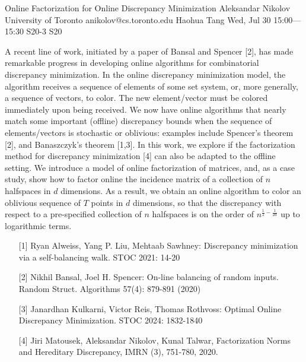 \begin{talk}
  {Online Factorization for Online Discrepancy Minimization}%
  {Aleksandar Nikolov}%
  {University of Toronto}%
  {anikolov@cs.toronto.edu}%
  {Haohua Tang}%
  {}%
  {Wed, Jul 30 15:00---15:30}%
  {S20-3}%
  {S20}%
  
    
   
A recent line of work, initiated by a paper of Bansal and Spencer [2], has made remarkable progress in developing online algorithms for combinatorial discrepancy minimization. In the online discrepancy minimization model, the algorithm receives a sequence of elements of some set system, or, more generally, a sequence of vectors, to color. The new element/vector must be colored immediately upon being received. We now have online algorithms that nearly match some important (offline) discrepancy bounds when the sequence of elements/vectors is stochastic or oblivious: examples include Spencer's theorem [2], and Banaszczyk's theorem [1,3]. In this work, we explore if the factorization method for discrepancy minimization [4] can also be adapted to the offline setting. We introduce a model of online factorization of matrices, and, as a case study, show how to factor online the incidence matrix of a collection of $n$ halfspaces in $d$ dimensions. As a result, we obtain an online algorithm to color an oblivious sequence of $T$ points in $d$ dimensions, so that the discrepancy with respect to a pre-specified collection of $n$ halfspaces is on the order of $n^{\frac12 - \frac{1}{2d}}$ up to logarithmic terms. 

\medskip

\begin{enumerate}
    \item[{[1]}] Ryan Alweiss, Yang P. Liu, Mehtaab Sawhney:
Discrepancy minimization via a self-balancing walk. STOC 2021: 14-20

 \item[{[2]}] Nikhil Bansal, Joel H. Spencer:
On-line balancing of random inputs. Random Struct. Algorithms 57(4): 879-891 (2020)

    \item[{[3]}] Janardhan Kulkarni, Victor Reis, Thomas Rothvoss:
Optimal Online Discrepancy Minimization. STOC 2024: 1832-1840

    \item[{[4]}] Jiri Matousek, Aleksandar Nikolov, Kunal Talwar, Factorization Norms and Hereditary Discrepancy, IMRN (3), 751-780, 2020. 

\end{enumerate}
\end{talk}

